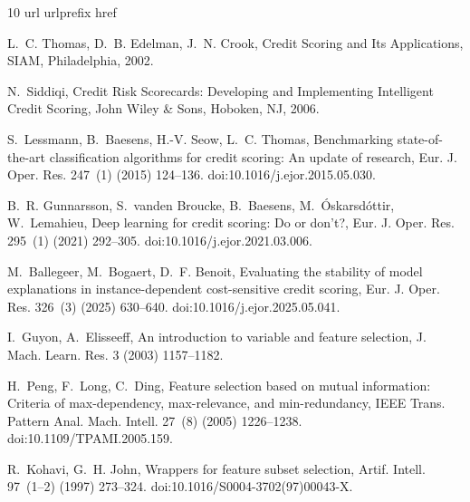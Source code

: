 \documentclass[final,5p,twocolumn]{elsarticle}
\begin{document}
\begingroup\footnotesize
\sloppy{}
\begin{thebibliography}{10}
\expandafter\ifx\csname url\endcsname\relax
  \def\url#1{\texttt{#1}}\fi
\expandafter\ifx\csname urlprefix\endcsname\relax\def\urlprefix{URL }\fi
\expandafter\ifx\csname href\endcsname\relax
  \def\href#1#2{#2} \def\path#1{#1}\fi

L.~C. Thomas, D.~B. Edelman, J.~N. Crook, Credit Scoring and Its Applications,
  SIAM, Philadelphia, 2002.

N.~Siddiqi, Credit Risk Scorecards: Developing and Implementing Intelligent
  Credit Scoring, John Wiley \& Sons, Hoboken, NJ, 2006.

S.~Lessmann, B.~Baesens, H.-V. Seow, L.~C. Thomas, Benchmarking
  state-of-the-art classification algorithms for credit scoring: An update of
  research, Eur. J. Oper. Res. 247~(1) (2015) 124--136.
\newblock \href {https://doi.org/10.1016/j.ejor.2015.05.030}
  {\path{doi:10.1016/j.ejor.2015.05.030}}.

B.~R. Gunnarsson, S.~vanden Broucke, B.~Baesens, M.~{\'O}skarsd{\'o}ttir,
  W.~Lemahieu, Deep learning for credit scoring: Do or don't?, Eur. J. Oper. Res. 295~(1) (2021) 292--305.
\newblock \href {https://doi.org/10.1016/j.ejor.2021.03.006}
  {\path{doi:10.1016/j.ejor.2021.03.006}}.

M.~Ballegeer, M.~Bogaert, D.~F. Benoit, Evaluating the stability of model
  explanations in instance-dependent cost-sensitive credit scoring, Eur. J. Oper. Res. 326~(3) (2025) 630--640.
\newblock \href {https://doi.org/10.1016/j.ejor.2025.05.041}
  {\path{doi:10.1016/j.ejor.2025.05.041}}.

I.~Guyon, A.~Elisseeff, An introduction to variable and feature selection,
  J. Mach. Learn. Res. 3 (2003) 1157--1182.

H.~Peng, F.~Long, C.~Ding, Feature selection based on mutual information:
  Criteria of max-dependency, max-relevance, and min-redundancy, IEEE Trans. Pattern Anal. Mach. Intell. 27~(8) (2005)
  1226--1238.
\newblock \href {https://doi.org/10.1109/TPAMI.2005.159}
  {\path{doi:10.1109/TPAMI.2005.159}}.

R.~Kohavi, G.~H. John, Wrappers for feature subset selection, Artif. Intell. 97~(1--2) (1997) 273--324.
\newblock \href {https://doi.org/10.1016/S0004-3702(97)00043-X}
  {\path{doi:10.1016/S0004-3702(97)00043-X}}.


\end{thebibliography}
\end{document}
